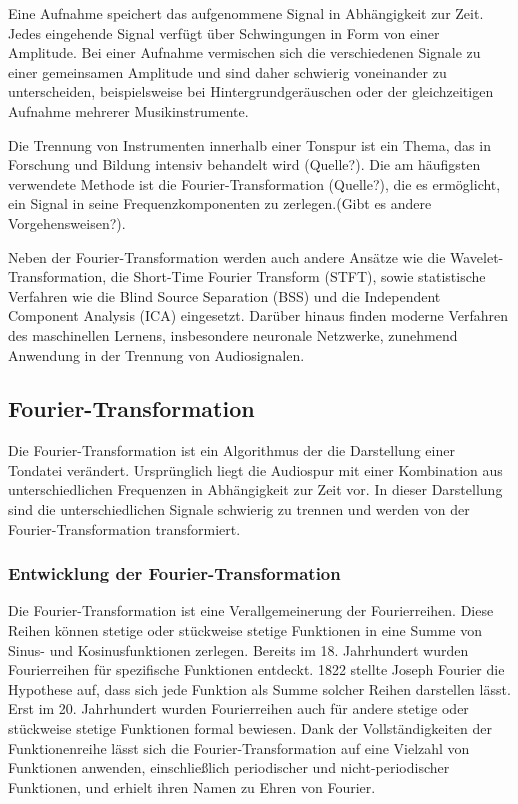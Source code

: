 Eine Aufnahme speichert das aufgenommene Signal in Abhängigkeit zur Zeit. Jedes eingehende Signal verfügt über Schwingungen in Form von einer Amplitude. Bei einer Aufnahme vermischen sich die verschiedenen Signale zu einer gemeinsamen Amplitude und sind daher schwierig voneinander zu unterscheiden, beispielsweise bei Hintergrundgeräuschen oder der gleichzeitigen Aufnahme mehrerer Musikinstrumente.

\par

Die Trennung von Instrumenten innerhalb einer Tonspur ist ein Thema, das in Forschung und Bildung intensiv behandelt wird (Quelle?). Die am häufigsten verwendete Methode ist die Fourier-Transformation (Quelle?), die es ermöglicht, ein Signal in seine Frequenzkomponenten zu zerlegen.(Gibt es andere Vorgehensweisen?).

\par

Neben der Fourier-Transformation werden auch andere Ansätze wie die Wavelet-Transformation, die Short-Time Fourier Transform (STFT), sowie statistische Verfahren wie die Blind Source Separation (BSS) und die Independent Component Analysis (ICA) eingesetzt. Darüber hinaus finden moderne Verfahren des maschinellen Lernens, insbesondere neuronale Netzwerke, zunehmend Anwendung in der Trennung von Audiosignalen.

%
\subsection{Fourier-Transformation}
%

Die Fourier-Transformation ist ein Algorithmus der die Darstellung einer Tondatei verändert. Ursprünglich liegt die Audiospur mit einer Kombination aus unterschiedlichen Frequenzen in Abhängigkeit zur Zeit vor. In dieser Darstellung sind die unterschiedlichen Signale schwierig zu trennen und werden von der Fourier-Transformation transformiert.

\par

%
\subsubsection{Entwicklung der Fourier-Transformation}
%

Die Fourier-Transformation ist eine Verallgemeinerung der Fourierreihen. Diese Reihen können stetige oder stückweise stetige Funktionen in eine Summe von Sinus- und Kosinusfunktionen zerlegen. Bereits im 18. Jahrhundert wurden Fourierreihen für spezifische Funktionen entdeckt. 1822 stellte Joseph Fourier die Hypothese auf, dass sich jede Funktion als Summe solcher Reihen darstellen lässt. Erst im 20. Jahrhundert wurden Fourierreihen auch für andere stetige oder stückweise stetige Funktionen formal bewiesen. Dank der Vollständigkeiten der Funktionenreihe lässt sich die Fourier-Transformation auf eine Vielzahl von Funktionen anwenden, einschließlich periodischer und nicht-periodischer Funktionen, und erhielt ihren Namen zu Ehren von Fourier.

